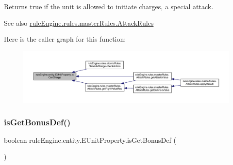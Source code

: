 \begin{DoxyReturn}{Returns}
true if the unit is allowed to initiate charges, a special attack. 
\end{DoxyReturn}
\begin{DoxySeeAlso}{See also}
\mbox{\hyperlink{classrule_engine_1_1rules_1_1master_rules_1_1_attack_rules}{rule\+Engine.\+rules.\+master\+Rules.\+Attack\+Rules}} 
\end{DoxySeeAlso}
Here is the caller graph for this function\+:
\nopagebreak
\begin{figure}[H]
\begin{center}
\leavevmode
\includegraphics[width=350pt]{enumrule_engine_1_1entity_1_1_e_unit_property_a546f8e7b0e437729dc8d606f301186aa_icgraph}
\end{center}
\end{figure}
\mbox{\label{enumrule_engine_1_1entity_1_1_e_unit_property_a4fe027f48fdcd08c55769992e4ad9f3d}} 
\subsubsection{\texorpdfstring{is\+Get\+Bonus\+Def()}{isGetBonusDef()}}
{\footnotesize\ttfamily boolean rule\+Engine.\+entity.\+E\+Unit\+Property.\+is\+Get\+Bonus\+Def (\begin{DoxyParamCaption}{ }\end{DoxyParamCaption})\hspace{0.3cm}{\ttfamily [inline]}}

